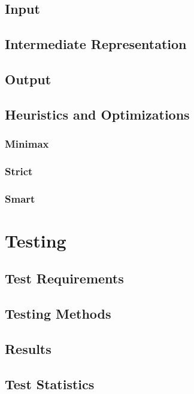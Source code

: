 \section{Input}
\section{Intermediate Representation}
\section{Output}
\section{Heuristics and Optimizations}
\subsection{Minimax}
\subsection{Strict}
\subsection{Smart}


\chapter{Testing}
\section{Test Requirements}
\section{Testing Methods}
\section{Results}
\section{Test Statistics}


